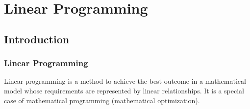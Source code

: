 \chapter{Linear Programming}

\section{Introduction}

\subsection{Linear Programming}

Linear programming is a method to achieve the best outcome in a mathematical model whose requirements are represented by linear relationships. It is a special case of mathematical programming (mathematical optimization).

